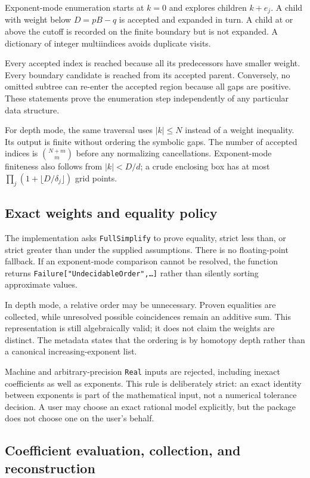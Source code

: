 \documentclass[11pt,a4paper]{article}
\theoremstyle{definition}
\theoremstyle{remark}
\newcommand{\code}[1]{\texttt{#1}}
\begin{document}
Exponent-mode enumeration starts at $k=0$ and explores children $k+e_j$.
A child with weight below $D=pB-q$ is accepted and expanded in turn. A child at
or above the cutoff is recorded on the finite boundary but is not expanded.
A dictionary of integer multiindices avoids duplicate visits.

Every accepted index is reached because all its predecessors have smaller
weight. Every boundary candidate is reached from its accepted parent.
Conversely, no omitted subtree can re-enter the accepted region because all
gaps are positive. These statements prove the enumeration step independently
of any particular data structure.

For depth mode, the same traversal uses $|k|\le N$ instead of a weight
inequality. Its output is finite without ordering the symbolic gaps. The
number of accepted indices is $\binom{N+m}{m}$ before any normalizing
cancellations. Exponent-mode finiteness also follows from
$|k|<D/d$; a crude enclosing box has at most
$\prod_j(1+\lfloor D/\delta_j\rfloor)$ grid points.

\subsection{Exact weights and equality policy}

The implementation asks \code{FullSimplify} to prove equality, strict less
than, or strict greater than under the supplied assumptions. There is no
floating-point fallback. If an exponent-mode comparison cannot be resolved,
the function returns \code{Failure["UndecidableOrder",\ldots]} rather than
silently sorting approximate values.

In depth mode, a relative order may be unnecessary. Proven equalities are
collected, while unresolved possible coincidences remain an additive sum.
This representation is still algebraically valid; it does not claim the
weights are distinct. The metadata states that the ordering is by homotopy
depth rather than a canonical increasing-exponent list.

Machine and arbitrary-precision \code{Real} inputs are rejected, including
inexact coefficients as well as exponents. This rule is deliberately strict:
an exact identity between exponents is part of the mathematical input, not a
numerical tolerance decision. A user may choose an exact rational model
explicitly, but the package does not choose one on the user's behalf.

\subsection{Coefficient evaluation, collection, and reconstruction}
\end{document}
